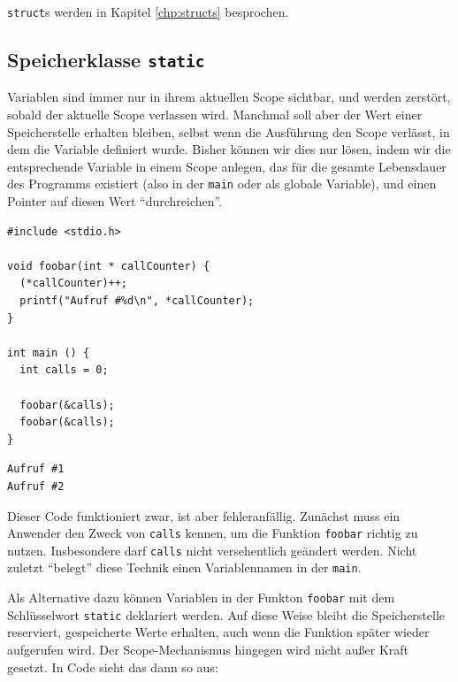 \texttt{struct}s werden in Kapitel \ref{chp:structs} besprochen.

\subsection{Speicherklasse \texttt{static}} \label{sec:staticVar}
Variablen sind immer nur in ihrem aktuellen Scope sichtbar, und werden \idR zerstört, sobald der aktuelle Scope verlassen wird. Manchmal soll aber der Wert einer Speicherstelle erhalten bleiben, selbst wenn die Ausführung den Scope verlässt, in dem die Variable definiert wurde. Bisher können wir dies nur lösen, indem wir die entsprechende Variable in einem Scope anlegen, das für die gesamte Lebensdauer des Programms existiert (also in der \texttt{main} oder als globale Variable), und einen Pointer auf diesen Wert \enquote{durchreichen}.

\begin{codebox}
\begin{verbatim}
#include <stdio.h>

void foobar(int * callCounter) {
  (*callCounter)++;
  printf("Aufruf #%d\n", *callCounter);
}

int main () {
  int calls = 0;

  foobar(&calls);
  foobar(&calls);
}
\end{verbatim}
\end{codebox}

\begin{cmdbox}
\begin{verbatim}
Aufruf #1
Aufruf #2
\end{verbatim}
\end{cmdbox}

Dieser Code funktioniert zwar, ist aber fehleranfällig. Zunächst muss ein Anwender den Zweck von \texttt{calls} kennen, um die Funktion \texttt{foobar} richtig zu nutzen. Insbesondere darf \texttt{calls} nicht versehentlich geändert werden. Nicht zuletzt \enquote{belegt} diese Technik einen Variablennamen in der \texttt{main}.

Als Alternative dazu können Variablen in der Funkton \texttt{foobar} mit dem Schlüsselwort \texttt{static} deklariert werden. Auf diese Weise bleibt die Speicherstelle reserviert, \ie gespeicherte Werte erhalten, auch wenn die Funktion später wieder aufgerufen wird. Der Scope-Mechanismus hingegen wird nicht außer Kraft gesetzt. In Code sieht das dann so aus:

